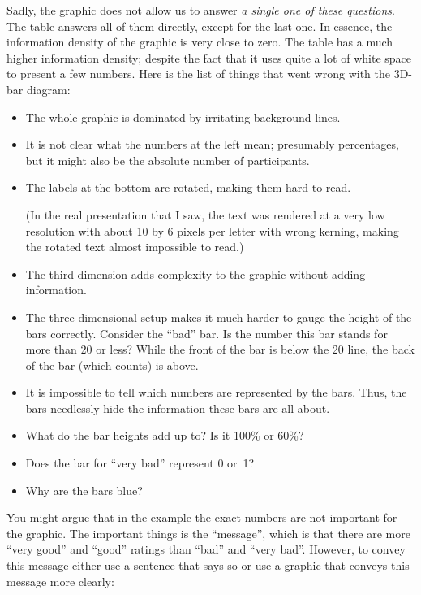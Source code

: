 Sadly, the graphic does not allow us to answer \emph{a single one of these
questions}. The table answers all of them directly, except for the last one. In
essence, the information density of the graphic is very close to zero. The
table has a much higher information density; despite the fact that it uses
quite a lot of white space to present a few numbers. Here is the list of things
that went wrong with the 3D-bar diagram:
%
\begin{itemize}
    \item The whole graphic is dominated by irritating background lines.
    \item It is not clear what the numbers at the left mean; presumably
        percentages, but it might also be the absolute number of
        participants.
    \item The labels at the bottom are rotated, making them hard to read.

        (In the real presentation that I saw, the text was rendered at a very
        low resolution with about 10 by 6 pixels per letter with wrong
        kerning, making the rotated text almost impossible to read.)
    \item The third dimension adds complexity to the graphic without adding
        information.
    \item The three dimensional setup makes it much harder to gauge the
        height of the bars correctly. Consider the ``bad'' bar. Is the number
        this bar stands for more than 20 or less? While the front of the bar
        is below the 20 line, the back of the bar (which counts) is above.
    \item It is impossible to tell which  numbers are represented by the
        bars. Thus, the bars needlessly hide the information these bars are
        all about.
    \item What do the bar heights add up to? Is it 100\% or 60\%?
    \item Does the bar for ``very bad'' represent 0 or~1?
    \item Why are the bars blue?
\end{itemize}

You might argue that in the example the exact numbers are not important for the
graphic. The important things is the ``message'', which is that there are more
``very good'' and ``good'' ratings than ``bad'' and ``very bad''. However, to
convey this message either use a sentence that says so or use a graphic that
conveys this message more clearly:

